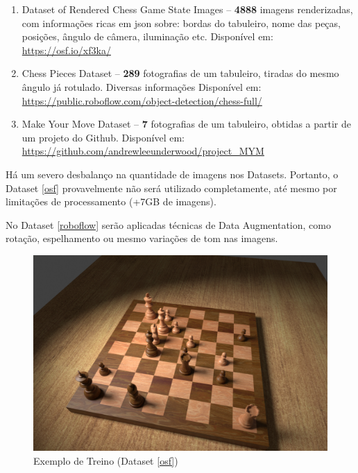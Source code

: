 \documentclass[a4paper,12pt,twoside]{article}
\begin{document}
\begin{enumerate}
    \item{Dataset of Rendered Chess Game State Images –
          \textbf{4888} imagens renderizadas, com informações ricas em json sobre: bordas do tabuleiro, nome das peças, posições, ângulo de câmera, iluminação etc.
      Disponível em: \url{https://osf.io/xf3ka/}}\label{osf}
    \item{Chess Pieces Dataset –
          \textbf{289} fotografias de um tabuleiro, tiradas do mesmo ângulo já rotulado. Diversas informações
      Disponível em: \url{https://public.roboflow.com/object-detection/chess-full/}}\label{roboflow}
    \item{Make Your Move Dataset –
          \textbf{7} fotografias de um tabuleiro, obtidas a partir de um projeto do Github.
      Disponível em: \url{https://github.com/andrewleeunderwood/project\_MYM}}\label{MYM}
\end{enumerate}

Há um severo desbalanço na quantidade de imagens nos Datasets.
Portanto, o Dataset \ref{osf} provavelmente não será utilizado completamente,
até mesmo por limitações de processamento (+7GB de imagens).

No Dataset \ref{roboflow} serão aplicadas técnicas de Data Augmentation,
como rotação, espelhamento ou mesmo variações de tom nas imagens.

\begin{figure}[h!]
\centering
  \includegraphics[width=\linewidth]{fig/treino.jpg}
  \caption{Exemplo de Treino (Dataset \ref{osf})}
\label{fig:treino}
\end{figure}
\end{document}
